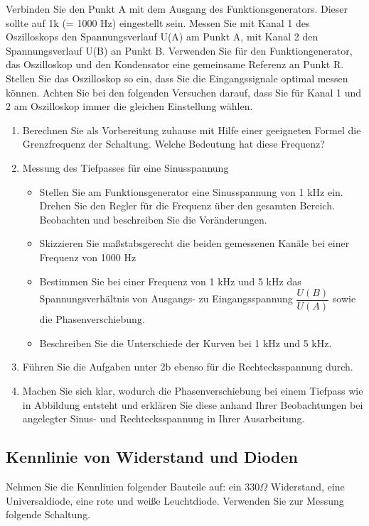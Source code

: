 \documentclass[paper=a4, fontsize=11pt]{scrartcl}
\numberwithin{equation}{section}
\numberwithin{figure}{section}
\numberwithin{table}{section}
\begin{document}
Verbinden Sie den Punkt A mit dem Ausgang des Funktionsgenerators. Dieser sollte auf 1k (= 1000 Hz) eingestellt sein. Messen Sie mit Kanal 1 des Oszilloskops den Spannungsverlauf U(A) am Punkt A, mit Kanal 2 den Spannungsverlauf U(B) an Punkt B. Verwenden Sie für den Funktiongenerator, das Oszilloskop und den Kondensator eine gemeinsame Referenz an Punkt R. Stellen Sie das Oszilloskop so ein, dass Sie die Eingangssignale optimal messen können. Achten Sie bei den folgenden Versuchen darauf, dass Sie für Kanal 1 und 2 am Oszilloskop immer die gleichen Einstellung wählen. \\

\begin{enumerate}
\item Berechnen Sie als Vorbereitung zuhause mit Hilfe einer geeigneten Formel die Grenzfrequenz der Schaltung. Welche Bedeutung hat diese Frequenz?
\item Messung des Tiefpasses für eine Sinusspannung
\begin{itemize}
\item Stellen Sie am Funktionsgenerator eine Sinusspannung von 1 kHz ein. Drehen Sie den Regler für die Frequenz über den gesamten Bereich. Beobachten und beschreiben Sie die Veränderungen.
\item Skizzieren Sie maßstabsgerecht die beiden gemessenen Kanäle bei einer Frequenz von 1000 Hz
\item Bestimmen Sie bei einer Frequenz von 1 kHz und 5 kHz das Spannungsverhältnis von Ausgangs- zu Eingangsspannung $\dfrac{U(B)}{U(A)}$ sowie die Phasenverschiebung.
\item Beschreiben Sie die Unterschiede der Kurven bei 1 kHz und 5 kHz.
\end{itemize}
\item Führen Sie die Aufgaben unter 2b ebenso für die Rechtecksspannung durch.
\item Machen Sie sich klar, wodurch die Phasenverschiebung bei einem Tiefpass wie in Abbildung entsteht und erklären Sie diese anhand Ihrer Beobachtungen bei angelegter Sinus- und Rechtecksspannung in Ihrer Ausarbeitung.
\end{enumerate}

\subsection{Kennlinie von Widerstand und Dioden}

Nehmen Sie die Kennlinien folgender Bauteile auf: ein $330 \Omega$ Widerstand, eine Universaldiode, eine rote und weiße Leuchtdiode. Verwenden Sie zur Messung folgende Schaltung. \\
\end{document}
